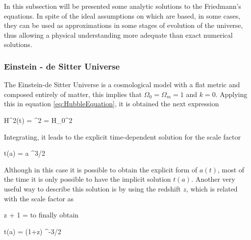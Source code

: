 In this subsection will be presented some analytic solutions to the 
Friedmann's equations. In spite of the ideal assumptions on which are
based, in some cases, they can be used as approximations in some stages
of evolution of the universe, thus allowing a physical understanding more 
adequate than exact numerical solutions.



			\subsubsection*{Einstein - de Sitter Universe}


The Einstein-de Sitter Universe is a cosmological model with a flat metric
and composed entirely of matter, this implies that $\Omega_0 = \Omega_m = 1$ 
and $k=0$. Applying this in equation \ref{eq:HubbleEquation}, it is obtained
the next expression



{ H^2(t) = ^2 = H_0^2  }


Integrating, it leads to the explicit time-dependent solution for the 
scale factor



{ t(a) =  a ^{3/2} }


Although in this case it is possible to obtain the explicit form of $a(t)$,
most of the time it is only possible to have the implicit solution $t(a)$.
Another very useful way to describe this solution is by using the redshift
$z$, which is related with the scale factor as \cite{longair2008}


{ z + 1 =  }
to finally obtain



{ t(a) =  (1+z) ^{-3/2} }



